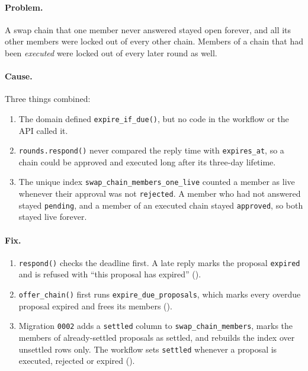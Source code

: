 \paragraph{Problem.} A swap chain that one member never answered stayed
open forever, and all its other members were locked out of every other
chain. Members of a chain that had been \emph{executed} were locked out
of every later round as well.

\paragraph{Cause.} Three things combined:
\begin{enumerate}
  \item The domain defined \texttt{expire\_if\_due()}, but no code in the
  workflow or the API called it.
  \item \texttt{rounds.respond()} never compared the reply time with
  \texttt{expires\_at}, so a chain could be approved and executed long
  after its three-day lifetime.
  \item The unique index \texttt{swap\_chain\_members\_one\_live} counted a
  member as live whenever their approval was not \texttt{rejected}. A
  member who had not answered stayed \texttt{pending}, and a member of an
  executed chain stayed \texttt{approved}, so both stayed live forever.
\end{enumerate}

\paragraph{Fix.}
\begin{enumerate}
  \item \texttt{respond()} checks the deadline first. A late reply marks
  the proposal \texttt{expired} and is refused with ``this proposal has
  expired'' ().
  \item \texttt{offer\_chain()} first runs \texttt{expire\_due\_proposals},
  which marks every overdue proposal expired and frees its members
  ().
  \item Migration \texttt{0002} adds a \texttt{settled} column to
  \texttt{swap\_chain\_members}, marks the members of already-settled
  proposals as settled, and rebuilds the index over unsettled rows only.
  The workflow sets \texttt{settled} whenever a proposal is executed,
  rejected or expired ().
\end{enumerate}

